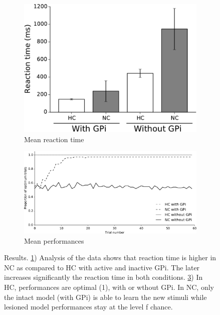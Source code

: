 \begin{figure}[h]
        \centering
        \begin{subfigure}[b]{0.4\textwidth}
                \includegraphics[width=\textwidth]{RTresults}

        		  \vspace{2mm}
                \caption{Mean reaction time}
                \label{fig:RTresults}
        \end{subfigure}
        \vspace{4mm}

        \begin{subfigure}[b]{0.9\textwidth}
                \includegraphics[width=\textwidth]{Performances}
        		  \vspace{2mm}
                \caption{Mean performances}
                \label{fig:Performances}
        \end{subfigure}
        \vspace{4mm}
        \caption{Results. \ref{fig:RTresults}) Analysis of the data shows that
          reaction time is higher in NC as compared to HC with active and
          inactive GPi. The later increases significantly the reaction time in
          both conditions.  \ref{fig:Performances}) In HC, performances are
          optimal (1), with or wthout GPi. In NC, only the intact model (with
          GPi) is able to learn the new stimuli while lesioned model
          performances stay at the level f chance.}
\end{figure}
